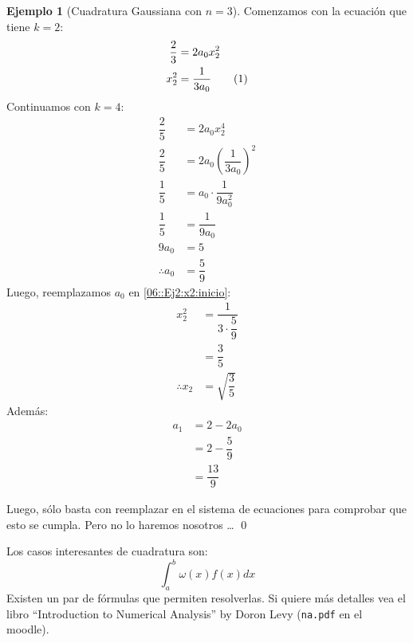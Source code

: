 \documentclass[english, spanish, fleqn, 10pt]{article}
\newcommand{\comillas}[1]{``#1''}
\numberwithin{equation}{section}
\newcommand{\nparentesis}[1]{\left( #1 \right)}
\theoremstyle{definition}
\newtheorem{beforeExample}{Ejemplo}[section]
\newenvironment{ejemplo}[1][]{\begin{beforeExample}[#1]\renewcommand{\qedsymbol}{$\blacksquare$}}{\qed\end{beforeExample}}
\newcommand\numberthis{\addtocounter{equation}{1}\tag{\theequation}}
\begin{document}
\begin{ejemplo}[Cuadratura Gaussiana con $n=3$]
	Comenzamos con la ecuación que tiene $k=2$:
	\begin{align*}
	\dfrac{2}{3}&=2a_0x_2^2\\
	 x_2^2&=\dfrac{1}{3a_0}\numberthis\label{06::Ej2:x2:inicio}
	\end{align*}
	Continuamos con $k=4$:
	\begin{align*}
	\dfrac{2}{5}&=2a_0x_2^4\\
	\dfrac{2}{5}&=2a_0\nparentesis{\dfrac{1}{3a_0}}^2\\
	\dfrac{1}{5}&=a_0\cdot \dfrac{1}{9a_0^2}\\
	\dfrac{1}{5}&=\dfrac{1}{9a_0}\\
	9a_0&=5\\
	\therefore a_0&=\dfrac{5}{9}
	\end{align*}
	Luego, reemplazamos $a_0$ en \eqref{06::Ej2:x2:inicio}:
	\begin{align*}
	x_2^2&=\dfrac{1}{3\cdot \dfrac{5}{9}}\\
	&=\dfrac{3}{5}\\
	\therefore x_2&=\sqrt{\dfrac{3}{5}}
	\end{align*}
	Además:
	\begin{align*}
	a_1&=2-2a_0\\
	&=2-\dfrac{5}{9}\\
	&=\dfrac{13}{9}
	\end{align*}
	
	Luego, sólo basta con reemplazar en el sistema de ecuaciones para comprobar que esto se cumpla. Pero no lo haremos nosotros \ldots
\end{ejemplo}

Los casos interesantes de cuadratura son:
\begin{equation}
\int_a^b\omega\nparentesis{x}f\nparentesis{x}\mathit{dx}
\end{equation}
Existen un par de fórmulas que permiten resolverlas. Si quiere más detalles vea el libro \comillas{Introduction to Numerical Analysis} by Doron Levy (\texttt{na.pdf} en el moodle).
\end{document}
